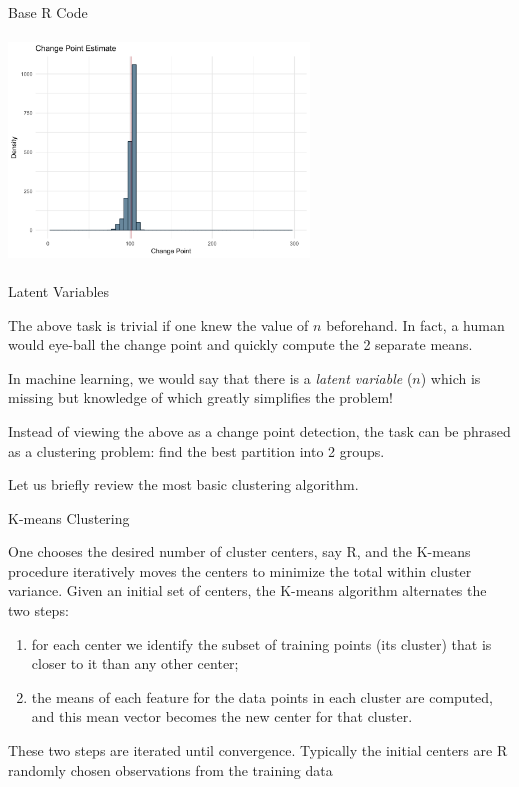 \documentclass[
  ignorenonframetext,
]{beamer}
\begin{document}
\begin{frame}{Base R Code}
\protect\hypertarget{base-r-code}{}

\begin{center}\includegraphics[width=8cm,height=6cm]{figures/ldaFig2_16_bernChangePointN-1} \end{center}

\end{frame}

\begin{frame}{Latent Variables}
\protect\hypertarget{latent-variables}{}

\footnotesize

The above task is trivial if one knew the value of \(n\) beforehand. In
fact, a human would eye-ball the change point and quickly compute the 2
separate means.

In machine learning, we would say that there is a
\textit{latent variable} (\(n\)) which is missing but knowledge of which
greatly simplifies the problem!

Instead of viewing the above as a change point detection, the task can
be phrased as a clustering problem: find the best partition into 2
groups.

Let us briefly review the most basic clustering algorithm.

\end{frame}

\begin{frame}{K-means Clustering}
\protect\hypertarget{k-means-clustering}{}

One chooses the desired number of cluster centers, say R, and the
K-means procedure iteratively moves the centers to minimize the total
within cluster variance. Given an initial set of centers, the K-means
algorithm alternates the two steps:

\begin{enumerate}
  \item for each center we identify the subset of training points (its cluster) that is closer to it than any other center;
  \item  the means of each feature for the data points in each cluster are
computed, and this mean vector becomes the new center for that cluster.
\end{enumerate}

These two steps are iterated until convergence. Typically the initial
centers are R randomly chosen observations from the training data

\end{frame}
\end{document}
